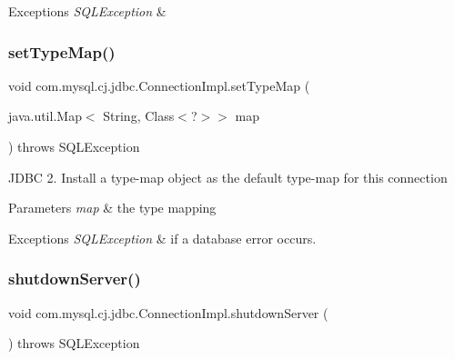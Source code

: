 \begin{DoxyExceptions}{Exceptions}
{\em S\+Q\+L\+Exception} & \\
\hline
\end{DoxyExceptions}
\mbox{\label{classcom_1_1mysql_1_1cj_1_1jdbc_1_1_connection_impl_a8cad56f950d2e2faa07c1d8e46116475}} 
\subsubsection{\texorpdfstring{set\+Type\+Map()}{setTypeMap()}}
{\footnotesize\ttfamily void com.\+mysql.\+cj.\+jdbc.\+Connection\+Impl.\+set\+Type\+Map (\begin{DoxyParamCaption}\item[{java.\+util.\+Map$<$ String, Class$<$?$>$$>$}]{map }\end{DoxyParamCaption}) throws S\+Q\+L\+Exception}

J\+D\+BC 2. Install a type-\/map object as the default type-\/map for this connection


\begin{DoxyParams}{Parameters}
{\em map} & the type mapping \\
\hline
\end{DoxyParams}

\begin{DoxyExceptions}{Exceptions}
{\em S\+Q\+L\+Exception} & if a database error occurs. \\
\hline
\end{DoxyExceptions}
\mbox{\label{classcom_1_1mysql_1_1cj_1_1jdbc_1_1_connection_impl_ad33978512e58f5bb84875219ffd8af41}} 
\subsubsection{\texorpdfstring{shutdown\+Server()}{shutdownServer()}}
{\footnotesize\ttfamily void com.\+mysql.\+cj.\+jdbc.\+Connection\+Impl.\+shutdown\+Server (\begin{DoxyParamCaption}{ }\end{DoxyParamCaption}) throws S\+Q\+L\+Exception}

